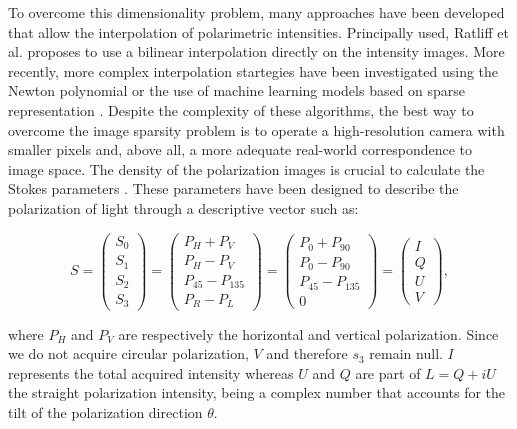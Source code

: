 To overcome this dimensionality problem, many approaches have been developed that allow the interpolation of polarimetric intensities. Principally used, Ratliff et al. \cite{ratliff2009interpolation} proposes to use a bilinear interpolation directly on the intensity images. More recently, more complex interpolation startegies have been investigated using the Newton polynomial \cite{li2019demosaicking} or the use of machine learning models based on sparse representation \cite{zhang2018sparse}.
Despite the complexity of these algorithms, the best way to overcome the image sparsity problem is to operate a high-resolution camera with smaller pixels and, above all, a more adequate real-world correspondence to image space.
The density of the polarization images is crucial to calculate the Stokes parameters \cite{stokes1851composition}.
These parameters have been designed to describe the polarization of light through a descriptive vector such as:

\begin{equation}
S = \begin{pmatrix}S_0\\S_1\\S_2\\S_3\end{pmatrix} = \begin{pmatrix}P_H + P_V\\ P_H - P_V\\ P_{45} - P_{135} \\ P_R - P_L\end{pmatrix} = \begin{pmatrix}P_0 + P_{90}\\ P_0 - P_{90}\\ P_{45} - P_{135} \\ 0\end{pmatrix} = \begin{pmatrix}I\\ Q\\ U \\ V\end{pmatrix},
\end{equation}

where $P_H$ and $P_V$ are respectively the horizontal and vertical polarization. Since we do not acquire circular polarization, $V$ and therefore $s_3$ remain null. $I$ represents the total acquired intensity whereas $U$ and $Q$ are part of $L = Q + iU$ the straight polarization intensity, being a complex number that accounts for the tilt of the polarization direction $\theta$.


